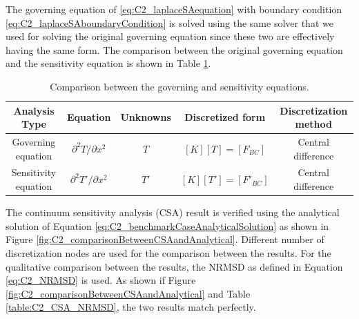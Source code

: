 The governing equation of \eqref{eq:C2_laplaceSAequation} with boundary condition \eqref{eq:C2_laplaceSAboundaryCondition} is solved using the same solver that we used for solving the original governing equation since these two are effectively having the same form. The comparison between the original governing equation and the sensitivity equation is shown in Table \ref{table:C2_comparisonBetweenGEandSA}.

\begin{center}
\begin{table}[h]
\begin{tabular}{| c | c | c | c | c |}
    \hline
    Analysis Type & Equation & Unknowns & Discretized form & Discretization method \\ \hline \hline
    Governing equation & $\partial^2 T/\partial x^2$ & $T$ & $[K][T] = [F_{BC}]$ & Central difference \\ \hline
    Sensitivity equation & $\partial^2 T'/\partial x^2$ & $T'$ & $[K][T'] = [F'_{BC}]$ & Central difference \\ \hline
\end{tabular}
\caption{Comparison between the governing and sensitivity equations.}
\label{table:C2_comparisonBetweenGEandSA}
\end{table}
\end{center}

The continuum sensitivity analysis (CSA) result is verified using the analytical solution of Equation \eqref{eq:C2_benchmarkCaseAnalyticalSolution} as shown in Figure \ref{fig:C2_comparisonBetweenCSAandAnalytical}. Different number of discretization nodes are used for the comparison between the results. For the qualitative comparison between the results, the NRMSD as defined in Equation \eqref{eq:C2_NRMSD} is used. As shown if Figure \ref{fig:C2_comparisonBetweenCSAandAnalytical} and Table \ref{table:C2_CSA_NRMSD}, the two results match perfectly.

